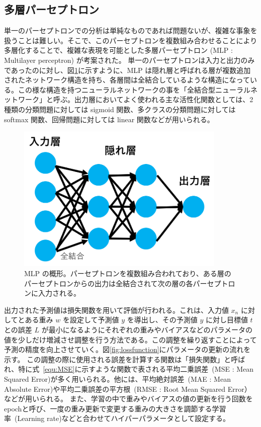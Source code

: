 \subsection{多層パーセプトロン}
単一のパーセプトロンでの分析は単純なものであれば問題ないが、複雑な事象を扱うことは難しい。そこで、このパーセプトロンを複数組み合わせることにより多層化することで、複雑な表現を可能とした多層パーセプトロン (MLP : Multilayer perceptron) が考案された。
単一のパーセプトロンは入力と出力のみであったのに対し、図\ref{fig:MLP}に示すように、MLP は隠れ層と呼ばれる層が複数追加されたネットワーク構造を持ち、各層間は全結合しているような構造になっている。この様な構造を持つニューラルネットワークの事を「全結合型ニューラルネットワーク」と呼ぶ。出力層においてよく使われる主な活性化関数としては、2種類の分類問題に対しては sigmoid 関数、多クラスの分類問題に対しては softmax 関数、回帰問題に対しては linear 関数などが用いられる。
\begin{figure}[tb]
  \centering
  \includegraphics[clip, width=10cm]{fig/4/MLP_re.png}
  \caption{MLP の概形。パーセプトロンを複数組み合われており、ある層のパーセプトロンからの出力は全結合されて次の層の各パーセプトロンに入力される。}
  \label{fig:MLP}
\end{figure}

出力された予測値は損失関数を用いて評価が行われる。これは、入力値 $x_n$ に対してとある重み $w$ を設定して予測値 $y$ を導出し、その予測値 $y$ に対し目標値 $t$ との誤差 $L$ が最小になるようにそれぞれの重みやバイアスなどのパラメータの値を少しだけ増減させ調整を行う方法である。この調整を繰り返すことによって予測の精度を向上させていく。図\ref{fig:lossfunction}にパラメータの更新の流れを示す。
この調整の際に使用される誤差を計算する関数は「損失関数」と呼ばれ、特に式~\eqref{equ:MSE}に示すような関数で表される平均二乗誤差~(MSE : Mean Squared Error)が多く用いられる。他には、平均絶対誤差~(MAE : Mean Absolute Error)や平均二乗誤差の平方根~(RMSE : Root Mean Squared Error）などが用いられる。
また、学習の中で重みやバイアスの値の更新を行う回数をepochと呼び、一度の重み更新で変更する重みの大きさを調節する学習率~(Learning rate)などと合わせてハイパーパラメータとして設定する。


